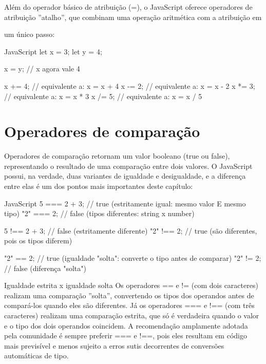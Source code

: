 Além do operador básico de atribuição (=), o JavaScript oferece operadores de atribuição ”atalho”, que combinam uma operação aritmética com a atribuição em

um único passo:

\begin{codebox}{JavaScript}
let x = 3;
let y = 4;

x = y;        // x agora vale 4

x += 4;       // equivalente a: x = x + 4
x -= 2;       // equivalente a: x = x - 2
x *= 3;       // equivalente a: x = x * 3
x /= 5;       // equivalente a: x = x / 5
\end{codebox}

\section{Operadores de comparação}

Operadores de comparação retornam um valor booleano (true ou false), representando o resultado de uma comparação entre dois valores. O JavaScript possui, na verdade, duas variantes de igualdade e desigualdade, e a diferença entre elas é um dos pontos mais importantes deste capítulo:

\begin{codebox}{JavaScript}
5 === 2 + 3;     // true (estritamente igual: mesmo valor E mesmo tipo)
"2" === 2;       // false (tipos diferentes: string x number)

5 !== 2 + 3;     // false (estritamente diferente)
"2" !== 2;       // true (são diferentes, pois os tipos diferem)

"2" == 2;        // true (igualdade "solta": converte o tipo antes de comparar)
"2" != 2;        // false (diferença "solta")
\end{codebox}

\begin{infobox}{Igualdade estrita x igualdade solta}
Os operadores == e != (com dois caracteres) realizam uma comparação ”solta”, convertendo os tipos dos operandos antes de compará-los quando eles são diferentes. Já os operadores === e !== (com três caracteres) realizam uma comparação estrita, que só é verdadeira quando o valor e o tipo dos dois operandos coincidem. A recomendação amplamente adotada pela comunidade é sempre preferir === e !==, pois eles resultam em código mais previsível e menos sujeito a erros sutis decorrentes de conversões automáticas de tipo.
\end{infobox}

